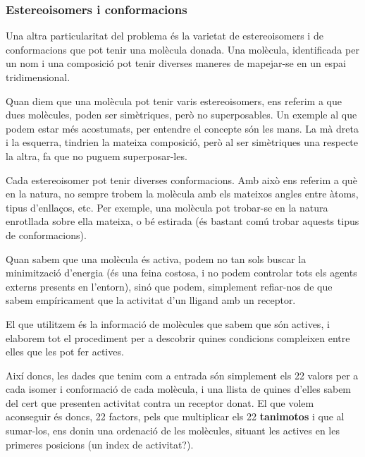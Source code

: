 \subsubsection{Estereoisomers i conformacions}
\label{ssub:estereoisomers i conformacions}

Una altra particularitat del problema és la varietat de estereoisomers i de
conformacions que pot tenir una molècula donada.  Una molècula, identificada per
un nom i una composició pot tenir diverses maneres de mapejar-se en un espai
tridimensional.

Quan diem que una molècula pot tenir varis estereoisomers, ens referim a que
dues molècules, poden ser simètriques, però no superposables.  Un exemple al que
podem estar més acostumats, per entendre el concepte són les mans.  La mà dreta
i la esquerra, tindrien la mateixa composició, però al ser simètriques una
respecte la altra, fa que no puguem superposar-les.

Cada estereoisomer pot tenir diverses conformacions.  Amb això ens referim a què
en la natura, no sempre trobem la molècula amb els mateixos angles entre àtoms,
tipus d'enllaços, etc. Per exemple, una molècula pot trobar-se en la natura
enrotllada sobre ella mateixa, o bé estirada (és bastant comú trobar aquests
tipus de conformacions).


Quan sabem que una molècula és activa, podem no tan sols buscar la minimització
d'energia (és una feina costosa, i no podem controlar tots els agents externs
presents en l'entorn), sinó que podem, simplement refiar-nos de que sabem
empíricament que la activitat d'un lligand amb un receptor.



El que utilitzem és la informació de molècules que sabem que són actives,
i elaborem tot el procediment per a descobrir quines condicions compleixen entre
elles que les pot fer actives.

Així doncs, les dades que tenim com a entrada són simplement els 22 valors per a cada isomer i
conformació de cada molècula, i una llista de quines d'elles sabem del cert que presenten activitat
contra un receptor donat.  El que volem aconseguir és doncs, 22 factors, pels que multiplicar els 22
\textbf{tanimotos} i que al sumar-los, ens donin una ordenació de les molècules, situant les actives
en les primeres posicions (un index de activitat?).

